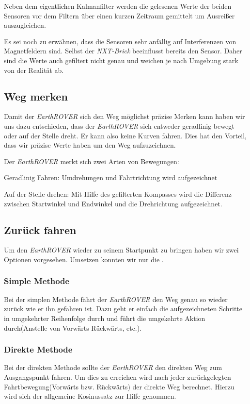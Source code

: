 Neben dem eigentlichen Kalmanfilter werden die gelesenen Werte der beiden Sensoren vor dem Filtern über einen kurzen Zeitraum gemittelt um Ausreißer auszugleichen.

Es sei noch zu erwähnen, dass die Sensoren sehr anfällig auf Interferenzen von Magnetfeldern sind. Selbst der \textit{NXT-Brick} beeinflusst bereits den Sensor. Daher sind die Werte auch gefiltert nicht genau und weichen je nach Umgebung stark von der Realität ab.

\subsection{Weg merken}
Damit der \textit{EarthROVER} sich den Weg möglichst präzise Merken kann haben wir uns dazu entschieden, dass der \textit{EarthROVER} sich entweder geradlinig bewegt oder auf der Stelle dreht. Er kann also keine Kurven fahren. Dies hat den Vorteil, dass wir präzise Werte haben um den Weg aufzuzeichnen.

Der \textit{EarthROVER} merkt sich zwei Arten von Bewegungen:
\begin{capitemize}[Bewegungsarten]
	\item Geradlinig Fahren: Umdrehungen und Fahrtrichtung wird aufgezeichnet
	\item Auf der Stelle drehen: Mit Hilfe des gefilterten Kompasses wird die Differenz zwischen Startwinkel und Endwinkel und die Drehrichtung aufgezeichnet.
\end{capitemize}

\subsection{Zurück fahren}
Um den \textit{EarthROVER} wieder zu seinem Startpunkt zu bringen haben wir zwei Optionen vorgesehen. Umsetzen konnten wir nur die .

\subsubsection{Simple Methode}
\label{lbl:simplemethod}
Bei der simplen Methode fährt der \textit{EarthROVER} den Weg genau so wieder zurück wie er ihn gefahren ist. Dazu geht er einfach die aufgezeichneten Schritte in umgekehrter Reihenfolge durch und führt die umgekehrte Aktion durch(Anstelle von Vorwärts Rückwärts, etc.).

\subsubsection{Direkte Methode}
Bei der direkten Methode sollte der \textit{EarthROVER} den direkten Weg zum Ausgangspunkt fahren. Um dies zu erreichen wird nach jeder zurückgelegten Fahrtbewegung(Vorwärts bzw. Rückwärts) der direkte Weg berechnet. Hierzu wird sich der allgemeine Kosinussatz zur Hilfe genommen.

